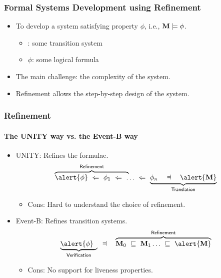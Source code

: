 \begin{frame}
  \frametitle{Formal Systems Development using Refinement}

  \begin{itemize}
  \item To develop a system \Mch satisfying property $\phi$, i.e., $\mathbf{M}
    \models \phi$.
    \smallskip
    \begin{itemize}
    \item \Mch: some transition system
      \smallskip
    \item $\phi$: some logical formula
    \end{itemize}
    \medskip
  \item The main challenge: the \alert{complexity of the system}.
    \medskip
  \item \alert{Refinement} allows the step-by-step design of the
    system.
  \end{itemize}
\end{frame}

\begin{frame}
  \frametitle{Refinement}
  \framesubtitle{The UNITY way vs. the Event-B way}


  \begin{itemize}
  \item UNITY: Refines the \alert{formulae}.
    \[
    \lefteqn{\overbrace{\phantom{\phi \wide\follows \phi_1
          \wide\follows \ldots \wide\follows
          \phi_n}}^{\textsf{Refinement}}} \alert{\phi} \wide\follows \phi_1
    \wide\follows \ldots \wide\follows \underbrace{\phi_n \WIDE\dashV
      \alert{\Mch}}_{\textsf{Translation}}
    \]
    \begin{itemize}
    \item<2-> Cons: \alert{Hard to understand} the choice of refinement.
    \end{itemize}
    \medskip

  \item Event-B: Refines \alert{transition systems}.
    \[
    \lefteqn{
      \underbrace{\phantom{\phi \WIDE\dashV
        \Mch_0}}_{\textsf{Verification}}}  \alert{\phi} \WIDE\dashV
        \overbrace{\Mch_0 \wide\abstracts \Mch_1 \ldots \wide\abstracts \alert{\Mch}}^{\textsf{Refinement}}
    \]
    \begin{itemize}
    \item<2-> Cons: No support for \alert{liveness properties}.
    \end{itemize}
  \end{itemize}
\end{frame}

